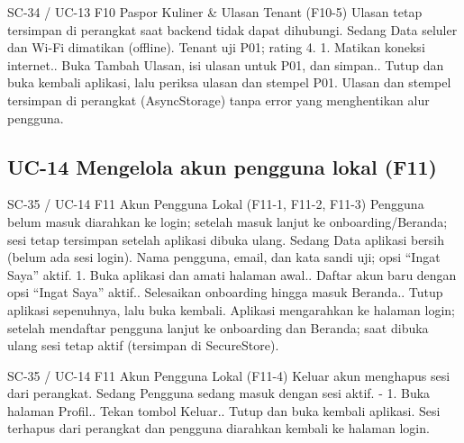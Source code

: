 \renewcommand{\tcactual}{Sesuai ekspektasi pada perangkat Android (Lolos via \texttt{09-passport} (10/10) \& \texttt{passport.test} (10/10)). Ulasan dan stempel tersimpan di perangkat (AsyncStorage) tanpa error yang menghentikan alur pengguna.}
{SC-34 / UC-13}
{F10 Paspor Kuliner \& Ulasan Tenant}
{(F10-5) Ulasan tetap tersimpan di perangkat saat backend tidak dapat dihubungi.}
{Sedang}
{Data seluler dan Wi-Fi dimatikan (offline).}
{Tenant uji P01; rating 4.}
{1. Matikan koneksi internet.. Buka Tambah Ulasan, isi ulasan untuk P01, dan simpan.. Tutup dan buka kembali aplikasi, lalu periksa ulasan dan stempel P01.}
{Ulasan dan stempel tersimpan di perangkat (AsyncStorage) tanpa error yang menghentikan alur pengguna.}

\subsection*{UC-14 Mengelola akun pengguna lokal (F11)}

\renewcommand{\tcactual}{Sesuai ekspektasi pada perangkat Android (Lolos via \texttt{auth.test} (21/21) \& \texttt{10-onboarding} (9/9)). Aplikasi mengarahkan ke halaman login; setelah mendaftar pengguna lanjut ke onboarding dan Beranda; saat dibuka ulang sesi tetap aktif (tersimpan di SecureStore).}
{SC-35 / UC-14}
{F11 Akun Pengguna Lokal}
{(F11-1, F11-2, F11-3) Pengguna belum masuk diarahkan ke login; setelah masuk lanjut ke onboarding/Beranda; sesi tetap tersimpan setelah aplikasi dibuka ulang.}
{Sedang}
{Data aplikasi bersih (belum ada sesi login).}
{Nama pengguna, email, dan kata sandi uji; opsi ``Ingat Saya'' aktif.}
{1. Buka aplikasi dan amati halaman awal.. Daftar akun baru dengan opsi ``Ingat Saya'' aktif.. Selesaikan onboarding hingga masuk Beranda.. Tutup aplikasi sepenuhnya, lalu buka kembali.}
{Aplikasi mengarahkan ke halaman login; setelah mendaftar pengguna lanjut ke onboarding dan Beranda; saat dibuka ulang sesi tetap aktif (tersimpan di SecureStore).}

\renewcommand{\tcactual}{Sesuai ekspektasi pada perangkat Android (Lolos via \texttt{auth.test} (21/21) \& \texttt{10-onboarding} (9/9)). Sesi terhapus dari perangkat dan pengguna diarahkan kembali ke halaman login.}
{SC-35 / UC-14}
{F11 Akun Pengguna Lokal}
{(F11-4) Keluar akun menghapus sesi dari perangkat.}
{Sedang}
{Pengguna sedang masuk dengan sesi aktif.}
{-}
{1. Buka halaman Profil.. Tekan tombol Keluar.. Tutup dan buka kembali aplikasi.}
{Sesi terhapus dari perangkat dan pengguna diarahkan kembali ke halaman login.}

